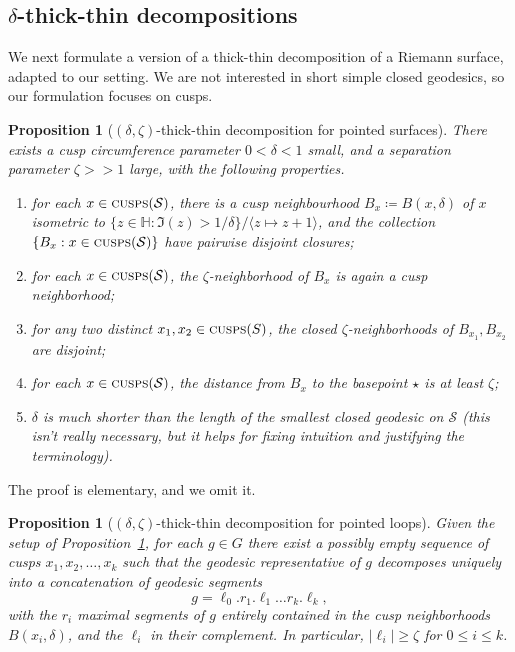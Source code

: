 \documentclass{amsart}
\newcommand\IH{{\mathbb{H}}}
\newtheorem{prop}[thm]{Proposition}
\theoremstyle{definition}
\theoremstyle{remark}
\newcommand{\cS}{\mathcal{S}}
\newcommand{\cusps}[1]{\text{\sc cusps}(#1)}
\renewcommand\gg{>\!\!>}
\begin{document}
\subsection{$\delta$-thick-thin decompositions}\label{subsecn:deltathickthin}
We next formulate a version of a thick-thin decomposition of a Riemann surface, adapted to our setting. We are not interested in short simple closed geodesics, so our formulation focuses on cusps. 
\begin{prop}[$(\delta,\zeta)$-thick-thin decomposition for pointed surfaces]\label{prop:thickthinsurface}
There exists a \emph{cusp circumference parameter} $0<\delta<1$ small, and a \emph{separation parameter} $\zeta\gg1$ large, with the following properties.
\begin{enumerate}
\item for each $x\in \cusps{\cS}$, there is a cusp neighbourhood $B_x\coloneqq B(x,\delta)$ of $x$ isometric to $\{z\in\IH:\Im(z)>1/\delta\}/\langle z \mapsto z+1\rangle$, and the collection $\{B_x: x\in \cusps{\cS}\}$ have pairwise disjoint closures;
\item for each $x\in \cusps{\cS}$, the $\zeta$-neighborhood of $B_x$ is again a cusp neighborhood; 
\item for any two distinct $x_1, x_2\in \cusps{S}$, the closed $\zeta$-neighborhoods of $B_{x_1}, B_{x_2}$ are disjoint; 
\item for each $x\in \cusps{\cS}$, the distance from $B_x$ to the basepoint $\star$ is at least $\zeta$; 
\item $\delta$ is much shorter than the length of the smallest closed geodesic on $\cS$ (this isn't really necessary, but it helps for fixing intuition and justifying the terminology). 
\end{enumerate}
\end{prop}

The proof is elementary, and we omit it. 

\begin{prop}[$(\delta,\zeta)$-thick-thin decomposition for pointed loops]\label{prop:thickthinloop}
Given the setup of Proposition~\ref{prop:thickthinsurface}, for each $g\in G$ there exist a possibly empty sequence of cusps $x_1, x_2, \ldots, x_k$ such that the geodesic representative of $g$ decomposes uniquely into a concatenation of geodesic segments
\[g=\ell_0.r_1.\ell_1\ldots r_k.\ell_k,\]
with the $r_i$ maximal segments of $g$ entirely contained in the cusp neighborhoods $B(x_i,\delta)$, and the $\ell_i$ in their complement. In particular, $|\ell_i|\ge\zeta$ for $0\le i\le k$.  
\end{prop}
\end{document}
